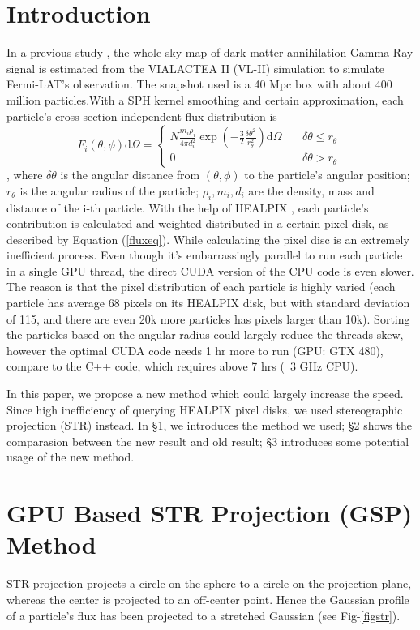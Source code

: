\documentclass[11pt,twoside]{article}
\begin{document}
\section*{Introduction}
In a previous study \citet{Kuhlen:2008kr}, the whole sky map of dark matter annihilation Gamma-Ray signal is estimated from the VIALACTEA II (VL-II) simulation to simulate Fermi-LAT's observation. The snapshot used is a 40 Mpc box with about 400 million particles.With a SPH kernel smoothing and certain approximation, each particle's cross section independent flux distribution is
\begin{equation}\label{fluxeq}
	F_i(\theta,\phi)\mathrm{d}\Omega = 
	\left\{\begin{aligned}
		N\frac{m_i\rho_i}{4\pi d_i^2} \exp\left(-\frac{3}2\frac{\delta\theta^2}{r_\theta^2}\right)\mathrm{d}\Omega  &\  & \delta\theta \le r_\theta \\
		0	&\   & \delta\theta > r_\theta\
	\end{aligned}\right.
\end{equation}
, where $\delta\theta$ is the angular distance from $(\theta, \phi)$ to the particle’s angular position; $r_\theta$ is the angular radius of the particle; $\rho_i, m_i, d_i$ are the density, mass and distance of the i-th particle. With the help of HEALPIX \citep{Gorski:2005ku}, each particle's contribution is calculated and weighted distributed in a certain pixel disk, as described by Equation (\ref{fluxeq}). While calculating the pixel disc is an extremely inefficient process. Even though it's embarrassingly parallel to run each particle in a single GPU thread, the direct CUDA version of the CPU code is even slower. The reason is that the pixel distribution of each particle is highly varied (each particle has average 68 pixels on its HEALPIX disk, but with standard deviation of 115, and there are even 20k more particles has pixels larger than 10k). Sorting the particles based on the angular radius could largely reduce the threads skew, however the optimal CUDA code needs 1 hr more to run (GPU: GTX 480), compare to the C++ code, which requires above 7 hrs (~3 GHz CPU). 

In this paper, we propose a new method which could largely increase the speed. Since high inefficiency of querying HEALPIX pixel disks, we used stereographic projection (STR) instead. In \S 1, we introduces the method we used; \S 2 shows the comparasion between the new result and old result; \S 3 introduces some potential usage of the new method.


\section{GPU Based STR Projection (GSP) Method}
STR projection projects a circle on the sphere to a circle on the projection plane, whereas the center is projected to an off-center point. Hence the Gaussian profile of a particle's flux has been projected to a stretched Gaussian (see Fig-\ref{figstr}). 
\end{document}
